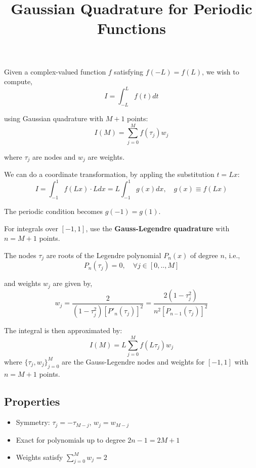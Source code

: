 \documentclass{article}
\title{Gaussian Quadrature for Periodic Functions}
\author{}
\date{}
\begin{document}
\maketitle

Given a complex-valued function \(f\) satisfying \(f(-L) = f(L)\), we wish to compute,
\begin{equation}
    I = \int_{-L}^{L} f(t)  dt
\end{equation}

using Gaussian quadrature with \(M+1\) points:
\begin{equation}
I(M) = \sum_{j=0}^{M} f(\tau_j) w_j
\end{equation}

where \(\tau_j\) are nodes and \(w_j\) are weights.

We can do a coordinate transformation, by appling the substitution \(t = Lx\):
\begin{equation}
    I = \int_{-1}^{1} f(Lx) \cdot L  dx = L \int_{-1}^{1} g(x)  dx, \quad g(x) \equiv f(Lx)
\end{equation}

The periodic condition becomes \(g(-1) = g(1)\).

For integrals over \([-1, 1]\), use the \textbf{Gauss-Legendre quadrature} with \(n = M+1\) points. 

The nodes \(\tau_j\) are roots of the Legendre polynomial \(P_n(x)\) of degree \(n\), i.e.,
\begin{equation}
    P_n(\tau_j) = 0, \quad \forall j\in[0,..,M]
\end{equation}

and weights \(w_j\) are given by,
\begin{equation}
    w_j = \frac{2}{(1 - \tau_j^2) [P'_n(\tau_j)]^2} = \frac{2(1 - \tau_j^2)}{n^2 [P_{n-1}(\tau_j)]^2}
\end{equation}

The integral is then approximated by:
\[
I(M) = L \sum_{j=0}^{M} f(L \tau_j) w_j
\]
where \(\{\tau_j, w_j\}_{j=0}^{M}\) are the Gauss-Legendre nodes and weights for \([-1, 1]\) with \(n = M+1\) points.


\subsection*{Properties}
\begin{itemize}
  \item Symmetry: \(\tau_j = -\tau_{M-j}\),  \(w_j = w_{M-j}\)
  \item Exact for polynomials up to degree \(2n-1 = 2M+1\)
  \item Weights satisfy \(\sum_{j=0}^{M} w_j = 2\)
\end{itemize}
\end{document}
